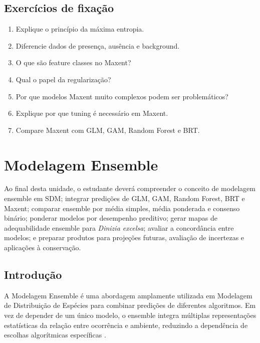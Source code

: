 \documentclass{ueap-sdm}
\begin{document}
\section{Exercícios de fixação}

\begin{enumerate}
	\item Explique o princípio da máxima entropia.
	\item Diferencie dados de presença, ausência e background.
	\item O que são feature classes no Maxent?
	\item Qual o papel da regularização?
	\item Por que modelos Maxent muito complexos podem ser problemáticos?
	\item Explique por que tuning é necessário em Maxent.
	\item Compare Maxent com GLM, GAM, Random Forest e BRT.
\end{enumerate}


\chapter[Modelagem Ensemble]{Modelagem Ensemble}

\begin{objetivos}
	Ao final desta unidade, o estudante deverá compreender o conceito de modelagem ensemble em SDM; integrar predições de GLM, GAM, Random Forest, BRT e Maxent; comparar ensemble por média simples, média ponderada e consenso binário; ponderar modelos por desempenho preditivo; gerar mapas de adequabilidade ensemble para \textit{Dinizia excelsa}; avaliar a concordância entre modelos; e preparar produtos para projeções futuras, avaliação de incertezas e aplicações à conservação.
\end{objetivos}

\section{Introdução}

A Modelagem Ensemble é uma abordagem amplamente utilizada em Modelagem de Distribuição de Espécies para combinar predições de diferentes algoritmos. Em vez de depender de um único modelo, o ensemble integra múltiplas representações estatísticas da relação entre ocorrência e ambiente, reduzindo a dependência de escolhas algorítmicas específicas \parencite{araujo2007ensemble,thuiller2009biomod,guisan2017habitat}.
\end{document}
